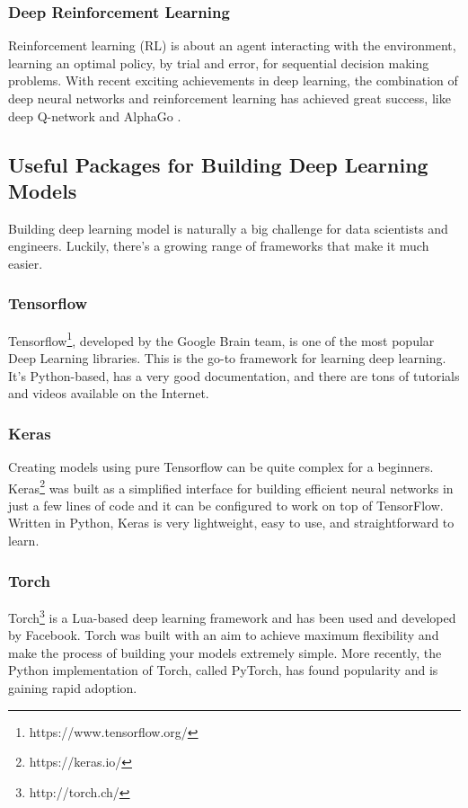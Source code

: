 \documentclass[twoside]{article}
\begin{document}
\subsubsection*{Deep Reinforcement Learning}

Reinforcement learning (RL) is about an agent interacting with the environment, learning an optimal policy, by trial and error, for sequential decision making problems. With recent exciting achievements in deep learning, the combination of deep neural networks and reinforcement learning has achieved great success, like deep Q-network \cite{mnih2015human}  and AlphaGo \cite{silver2016alphago}. 



\subsection{Useful Packages for Building Deep Learning Models}
Building deep learning model is naturally a big challenge for data scientists and engineers. Luckily, there’s a growing range of frameworks that make it much easier.

\subsubsection*{Tensorflow}

Tensorflow\footnote{https://www.tensorflow.org/}, developed by the Google Brain team, is one of the most popular Deep Learning libraries. This is the go-to framework for learning deep learning. It's Python-based, has a very good documentation, and there are tons of tutorials and videos available on the Internet.

\subsubsection*{Keras}

Creating models using pure Tensorflow can be quite complex for a beginners. Keras\footnote{https://keras.io/} was built as a simplified interface for building efficient neural networks in just a few lines of code and it can be configured to work on top of TensorFlow. Written in Python, Keras is very lightweight, easy to use, and straightforward to learn.

\subsubsection*{Torch}

Torch\footnote{http://torch.ch/}  is a Lua-based deep learning framework and has been used and developed by Facebook. Torch was built with an aim to achieve maximum flexibility and make the process of building your models extremely simple. More recently, the Python implementation of Torch, called PyTorch, has found popularity and is gaining rapid adoption.
\end{document}
